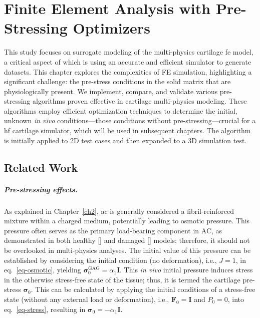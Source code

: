 \chapter{Finite Element Analysis with Pre-Stressing Optimizers}\label{ch3}

This study focuses on surrogate modeling of the multi-physics cartilage \ac{fe} model, a critical aspect of which is using an accurate and efficient simulator to generate datasets. This chapter explores the complexities of FE simulation, highlighting a significant challenge: the pre-stress conditions in the solid matrix that are physiologically present. We implement, compare, and validate various pre-stressing algorithms proven effective in cartilage multi-physics modeling. These algorithms employ efficient optimization techniques to determine the initial, unknown \textit{in vivo} conditions—those conditions without pre-stressing—crucial for a \ac{hf} cartilage simulator, which will be used in subsequent chapters. The algorithm is initially applied to 2D test cases and then expanded to a 3D simulation test.

\section{Related Work}

\paragraph{Pre-stressing effects.} As explained in Chapter~\ref{ch2}, \ac{ac} is generally considered a fibril-reinforced mixture within a charged medium, potentially leading to osmotic pressure. This pressure often serves as the primary load-bearing component in AC, as demonstrated in both healthy [\cite{quiroga2017}] and damaged [\cite{sajjadinia2019}] models; therefore, it should not be overlooked in multi-physics analyses. The initial value of this pressure can be established by considering the initial condition (no deformation), i.e., $J = 1$, in eq.~\ref{eq-osmotic}, yielding $\boldsymbol{\sigma}^{\text{GAG}}_0 = \alpha_1 \mathbf{I}$. This \textit{in vivo} initial pressure induces stress in the otherwise stress-free state of the tissue; thus, it is termed the cartilage pre-stress $\boldsymbol{\sigma}_0$. This can be calculated by applying the initial conditions of a stress-free state (without any external load or deformation), i.e., $\textbf{F}_0=\textbf{I}$ and $P_0 = 0$, into eq.~\ref{eq-stress}, resulting in $\boldsymbol{\sigma}_0 = -\alpha_1 \mathbf{I}$.

